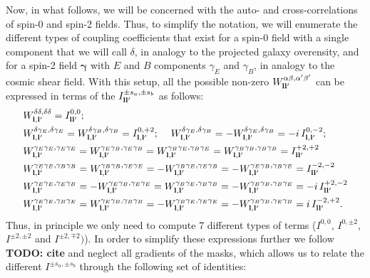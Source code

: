 \documentclass[a4paper,11pt]{article}
\newcommand{\todo}[1]{{\bf TODO: #1}}
\begin{document}
    Now, in what follows, we will be concerned with the auto- and cross-correlations of spin-0 and spin-2 fields. Thus, to simplify the notation, we will enumerate the different types of coupling coefficients that exist for a spin-0 field with a single component that we will call $\delta$, in analogy to the projected galaxy overensity, and for a spin-2 field $\mathbf{\gamma}$ with $E$ and $B$ components $\gamma_E$ and $\gamma_B$, in analogy to the cosmic shear field. With this setup, all the possible non-zero $W^{\alpha\beta,\alpha'\beta'}_{{\bf l}{\bf l}'}$ can be expressed in terms of the $I^{\pm s_a,\pm s_b}_{{\bf l}{\bf l}'}$ as follows:
    \begin{align}\label{eq:coeff}
      &W^{\delta\delta,\delta\delta}_{{\bf l},{\bf l}'}=I^{0,0}_{{\bf l}{\bf l}'}; \\
      &W^{\delta\gamma_E,\delta\gamma_E}_{{\bf l},{\bf l}'}=W^{\delta\gamma_B,\delta\gamma_B}_{{\bf l},{\bf l}'}=I^{0,+2}_{{\bf l},{\bf l}'};\hspace{12pt}
      W^{\delta\gamma_E,\delta\gamma_B}_{{\bf l},{\bf l}'}=-W^{\delta\gamma_E,\delta\gamma_B}_{{\bf l},{\bf l}'}=-i\,I^{0,-2}_{{\bf l},{\bf l}'};\\
      &W^{\gamma_E\gamma_E,\gamma_E\gamma_E}_{{\bf l},{\bf l}'}=W^{\gamma_E\gamma_B,\gamma_E\gamma_B}_{{\bf l},{\bf l}'}=W^{\gamma_B\gamma_E,\gamma_B\gamma_E}_{{\bf l},{\bf l}'}=W^{\gamma_B\gamma_B,\gamma_B\gamma_B}_{{\bf l},{\bf l}'}=I^{+2,+2}_{{\bf l}{\bf l}'}\\
      &W^{\gamma_E\gamma_E,\gamma_B\gamma_B}_{{\bf l},{\bf l}'}=W^{\gamma_B\gamma_B,\gamma_E\gamma_E}_{{\bf l},{\bf l}'}=-W^{\gamma_B\gamma_E,\gamma_E\gamma_B}_{{\bf l},{\bf l}'}=-W^{\gamma_E\gamma_B,\gamma_B\gamma_E}_{{\bf l},{\bf l}'}=I^{-2,-2}_{{\bf l}{\bf l}'}\\
      &W^{\gamma_E\gamma_E,\gamma_E\gamma_B}_{{\bf l},{\bf l}'}=-W^{\gamma_E\gamma_B,\gamma_E\gamma_E}_{{\bf l},{\bf l}'}=W^{\gamma_B\gamma_E,\gamma_B\gamma_B}_{{\bf l},{\bf l}'}=-W^{\gamma_B\gamma_B,\gamma_B\gamma_E}_{{\bf l},{\bf l}'}=-i\,I^{+2,-2}_{{\bf l}{\bf l}'}\\
      &W^{\gamma_E\gamma_E,\gamma_B\gamma_E}_{{\bf l},{\bf l}'}=W^{\gamma_E\gamma_B,\gamma_B\gamma_B}_{{\bf l},{\bf l}'}=-W^{\gamma_B\gamma_E,\gamma_E\gamma_E}_{{\bf l},{\bf l}'}=-W^{\gamma_B\gamma_B,\gamma_E\gamma_B}_{{\bf l},{\bf l}'}=i\,I^{-2,+2}_{{\bf l}{\bf l}'}.
    \end{align}
    Thus, in principle we only need to compute 7 different types of terms ($I^{0,0}$, $I^{0,\pm2}$, $I^{\pm2,\pm2}$ and $I^{\pm2,\mp2})$). In order to simplify these expressions further we follow \todo{cite} and neglect all gradients of the masks, which allows us to relate the different $I^{\pm s_a,\pm s_b}$ through the following set of identities:
\end{document}
